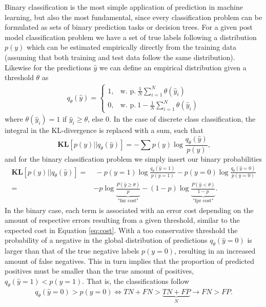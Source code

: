 \documentclass{article}
\begin{document}
Binary classification is the most simple application of prediction in machine learning, but also the most fundamental, since every classification problem can be formulated as sets of binary prediction tasks or decision trees. For a given post model classification problem we have a set of true labels following a distribution $p(y)$ which can be estimated empirically directly from the training data (assuming that both training and test data follow the same distribution). Likewise for the predictions $\hat{y}$ we can define an empirical distribution given a threshold $\theta$ as
\begin{align*}
    q_\theta(\hat{y}) = \begin{cases} 1, & \text{w. p.} \ \frac{1}{N}\sum_{i=1}^N \theta(\hat{y}_i) \\[0.2cm]
    0, &  \text{w. p.} \ 1 - \frac{1}{N}\sum_{i=1}^N \theta(\hat{y}_i) \end{cases}
\end{align*}
where $\theta(\hat{y}_i) = 1$ if $\hat{y}_i \geq \theta$, else 0.
In the case of discrete class classification, the integral in the KL-divergence is replaced with a sum, such that
\begin{equation}
\textbf{KL}[p(y) \vert\vert q_\theta(\hat{y})] = -\sum p(y) \log \frac{q_\theta(\hat{y})}{p(y)}\text{,}
\end{equation}
and for the binary classification problem we simply insert our binary probabilities
\begin{align}
\textbf{KL}[p(y) \vert\vert q_\theta(\hat{y})] = & \ - p(y=1) \log \frac{q_\theta(\hat{y}=1)}{p(y=1)} - p(y=0) \log \frac{q_\theta(\hat{y}=0)}{p(y=0)} \\ = & \label{eq:tprfpr} -p \log \underbrace{\frac{P(\hat{y}\geq \theta)}{p}}_\text{"fnr cost"} - (1-p) \log \underbrace{\frac{P(\hat{y} < \theta)}{1-p}}_\text{"fpr cost"} \text{.}
\end{align}
In the binary case, each term is associated with an error cost depending on the amount of respective errors resulting from a given threshold, similar to the expected cost in Equation \ref{eq:cost}. With a too conservative threshold the probability of a negative in the global distribution of predictions $q_\theta (\hat{y}=0)$ is larger than that of the true negative labels $p(y=0)$, resulting in an increased amount of false negatives. This in turn implies that the proportion of predicted positives must be smaller than the true amount of positives, $q_\theta(\hat{y} = 1) < p(y=1)$. That is, the classifications follow
\begin{align*}
    q_\theta(\hat{y}=0) > p(y=0) \iff  TN + FN > \underbrace{TN+FP}_{N} \rightarrow FN>FP \text{.}
\end{align*}
\end{document}
